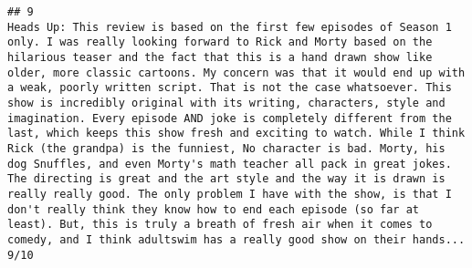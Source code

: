 \documentclass[
]{article}
\begin{document}
\begin{verbatim}
## 9                                                                                                                                                                                                                                                                                                                                                                                                                                                                                                                                                                                                                                                                                                                                                                                                                                                                                                                                                                                                                                                                                                                                                                                                                                                                                                                                                                                 Heads Up: This review is based on the first few episodes of Season 1 only. I was really looking forward to Rick and Morty based on the hilarious teaser and the fact that this is a hand drawn show like older, more classic cartoons. My concern was that it would end up with a weak, poorly written script. That is not the case whatsoever. This show is incredibly original with its writing, characters, style and imagination. Every episode AND joke is completely different from the last, which keeps this show fresh and exciting to watch. While I think Rick (the grandpa) is the funniest, No character is bad. Morty, his dog Snuffles, and even Morty's math teacher all pack in great jokes. The directing is great and the art style and the way it is drawn is really really good. The only problem I have with the show, is that I don't really think they know how to end each episode (so far at least). But, this is truly a breath of fresh air when it comes to comedy, and I think adultswim has a really good show on their hands... 9/10

\end{verbatim}
\end{document}
